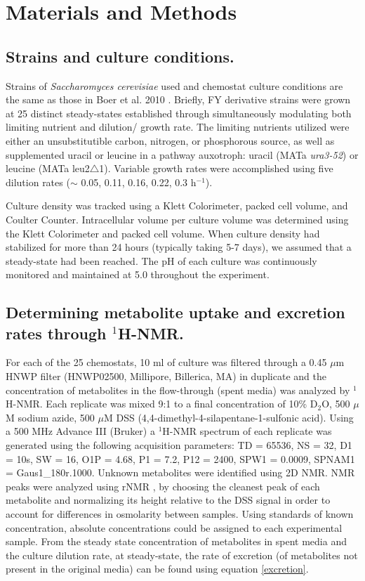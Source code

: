 
\section{Materials and Methods}

\subsection{Strains and culture conditions.} 

Strains of \textit{Saccharomyces cerevisiae} used and chemostat culture conditions are the same as those in Boer et al. 2010 \cite{main-Boer:2010fb}.  Briefly, FY derivative strains were grown at 25 distinct steady-states established through simultaneously modulating both limiting nutrient and dilution/ growth rate. The limiting nutrients utilized were either an unsubstitutible carbon, nitrogen, or phosphorous source, as well as supplemented uracil or leucine in a pathway auxotroph: uracil (MATa \textit{ura3-52}) or leucine (MATa leu2$\bigtriangleup$1).  Variable growth rates were accomplished using five dilution rates ($\sim$ 0.05, 0.11, 0.16, 0.22, 0.3 h$^{-1}$).

Culture density was tracked using a Klett Colorimeter, packed cell volume, and Coulter Counter. Intracellular volume per culture volume was determined using the Klett Colorimeter and packed cell volume.  When culture density had stabilized for more than 24 hours (typically taking 5-7 days), we assumed that a steady-state had been reached.  The pH of each culture was continuously monitored and maintained at 5.0 throughout the experiment.

\subsection{Determining metabolite uptake and excretion rates through $^{1}$H-NMR.}

For each of the 25 chemostats, 10 ml of culture was filtered through a 0.45 $\mu$m HNWP filter (HNWP02500, Millipore, Billerica, MA) in duplicate and the concentration of metabolites in the flow-through (spent media) was analyzed by $^{1}$H-NMR.  Each replicate was mixed 9:1 to a final concentration of 10\% D$_{2}$O, 500 $\mu$M sodium azide, 500 $\mu$M DSS (4,4-dimethyl-4-silapentane-1-sulfonic acid).  Using a 500 MHz Advance III (Bruker) a $^{1}$H-NMR spectrum of each replicate was generated using the following acquisition parameters: TD = 65536, NS = 32, D1 = 10s, SW = 16, O1P = 4.68, P1 = 7.2, P12 = 2400, SPW1 = 0.0009, SPNAM1 = Gaus1\_180r.1000.  Unknown metabolites were identified using 2D NMR.  NMR peaks were analyzed using rNMR \cite{Lewis:2009bx}, by choosing the cleanest peak of each metabolite and normalizing its height relative to the DSS signal in order to account for differences in osmolarity between samples.  Using standards of known concentration, absolute concentrations could be assigned to each experimental sample.  From the steady state concentration of metabolites in spent media and the culture dilution rate, at steady-state, the rate of excretion (of metabolites not present in the original media) can be found using equation \ref{excretion}.  

